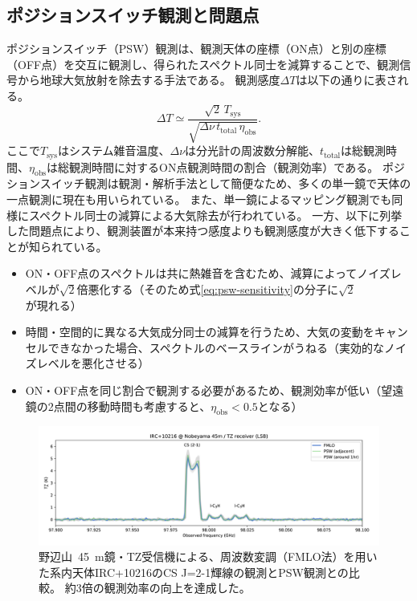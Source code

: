 \documentclass[a4paper,10pt,oneside,twocolumn,notitlepage,final]{jarticle}
\newcommand{\subrm}[1]{_{\mathrm{#1}}}
\begin{document}
\subsection{ポジションスイッチ観測と問題点}

ポジションスイッチ（PSW）観測は、観測天体の座標（ON点）と別の座標（OFF点）を交互に観測し、得られたスペクトル同士を減算することで、観測信号から地球大気放射を除去する手法である\citep{Wilson+13}。
観測感度$\Delta T$は以下の通りに表される。
\begin{equation}
    \Delta T
    \simeq\frac{\sqrt{2}\,T\subrm{sys}}{\sqrt{\Delta\nu\, t\subrm{total}\, \eta\subrm{obs}}}.
    \label{eq:psw-sensitivity}
\end{equation}
ここで$T\subrm{sys}$はシステム雑音温度、$\Delta\nu$は分光計の周波数分解能、$t\subrm{total}$は総観測時間、$\eta\subrm{obs}$は総観測時間に対するON点観測時間の割合（観測効率）である。
ポジションスイッチ観測は観測・解析手法として簡便なため、多くの単一鏡で天体の一点観測に現在も用いられている。
また、単一鏡によるマッピング観測でも同様にスペクトル同士の減算による大気除去が行われている。
一方、以下に列挙した問題点により、観測装置が本来持つ感度よりも観測感度が大きく低下することが知られている。

\begin{itemize}
    \item ON・OFF点のスペクトルは共に熱雑音を含むため、減算によってノイズレベルが$\sqrt{2}$倍悪化する（そのため式\ref{eq:psw-sensitivity}の分子に$\sqrt{2}$が現れる）
    \item 時間・空間的に異なる大気成分同士の減算を行うため、大気の変動をキャンセルできなかった場合、スペクトルのベースラインがうねる（実効的なノイズレベルを悪化させる）
    \item ON・OFF点を同じ割合で観測する必要があるため、観測効率が低い（望遠鏡の2点間の移動時間も考慮すると、$\eta\subrm{obs}<0.5$となる）
\end{itemize}

\begin{figure}[t]
    \centering
    \includegraphics[width=\textwidth]{figures/figure-2}
    \caption{
        野辺山~45~m鏡・TZ受信機による、周波数変調（FMLO法）を用いた系内天体IRC+10216のCS J=2-1輝線の観測とPSW観測との比較\citep{Taniguchi+20}。
        約3倍の観測効率の向上を達成した。
    }
    \label{fig:2}
\end{figure}
\end{document}
